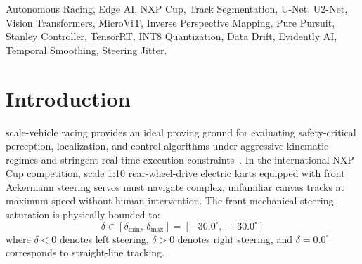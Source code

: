 \documentclass[10pt,journal,compsoc]{IEEEtran}
\begin{document}
{\begin{abstract}
(3) \textbf{Sub-Millisecond Edge Optimization:} An end-to-end compilation pipeline utilizing dynamic ONNX graph simplification and TensorRT INT8 entropy calibration, achieving execution latencies as low as \textbf{0.71\,ms to 2.18\,ms P50 (437 to 1324\,FPS)}---safely within the 10\,ms control budget ($>73\%$ safety margin);
(4) \textbf{Photometric Data Drift and Resilience Study:} Using Evidently AI covariate shift monitoring across 7 optical features, we demonstrate that while NVIDIA DAVE-2 and PalhanoCNN suffer catastrophic breakdown under severe shadows (+76.9\% and +59.5\% error explosion, respectively), MicroViT restricts drift degradation to \textbf{+21.1\%}. Furthermore, \texttt{MicroViTSmoothed} achieves near-complete environmental immunity with only \textbf{+8.2\% degradation} (+0.90$^\circ$ delta), suppresses servo actuator jitter by \textbf{$-$75.0\%} ($2.33^\circ \to 0.58^\circ$/frame), and attains the lowest continuous lap tracking error (\textbf{4.91$^\circ$}). Full validation across 3,433 high-resolution track frames and 31 unit test suites establishes an authoritative foundation for agile scale autonomous driving.
\end{abstract}

\begin{IEEEkeywords}
Autonomous Racing, Edge AI, NXP Cup, Track Segmentation, U-Net, U2-Net, Vision Transformers, MicroViT, Inverse Perspective Mapping, Pure Pursuit, Stanley Controller, TensorRT, INT8 Quantization, Data Drift, Evidently AI, Temporal Smoothing, Steering Jitter.
\end{IEEEkeywords}}

\maketitle
\IEEEdisplaynontitleabstractindextext
\IEEEpeerreviewmaketitle

\section{Introduction}
 scale-vehicle racing provides an ideal proving ground for evaluating safety-critical perception, localization, and control algorithms under aggressive kinematic regimes and stringent real-time execution constraints~\cite{bojarski2016end}. In the international NXP Cup competition, scale 1:10 rear-wheel-drive electric karts equipped with front Ackermann steering servos must navigate complex, unfamiliar canvas tracks at maximum speed without human intervention. The front mechanical steering saturation is physically bounded to:
\begin{equation}
\delta \in [\delta_{\min}, \, \delta_{\max}] = [-30.0^\circ, \, +30.0^\circ]
\end{equation}
where $\delta < 0$ denotes left steering, $\delta > 0$ denotes right steering, and $\delta = 0.0^\circ$ corresponds to straight-line tracking.
\end{document}

